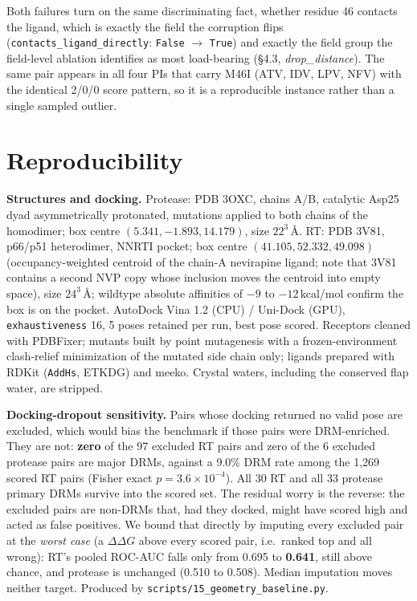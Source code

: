 \documentclass{article}
\newcommand{\ddg}{\ensuremath{\Delta\Delta G}}
\newcommand{\kcal}{\,kcal/mol}
\begin{document}
Both failures turn on the same discriminating fact, whether residue 46 contacts
the ligand, which is exactly the field the corruption flips
(\texttt{contacts\_ligand\_directly}: \texttt{False} $\rightarrow$ \texttt{True})
and exactly the field group the field-level ablation identifies as most load-bearing
(\S4.3, \emph{drop\_distance}). The same pair appears in all four PIs that carry
M46I (ATV, IDV, LPV, NFV) with the identical 2/0/0 score pattern, so it is a
reproducible instance rather than a single sampled outlier.

\section{Reproducibility}
\label{app:repro}

\textbf{Structures and docking.} Protease: PDB 3OXC, chains A/B, catalytic Asp25
dyad asymmetrically protonated, mutations applied to both chains of the homodimer;
box centre $(5.341, -1.893, 14.179)$, size $22^3$\,\AA. RT: PDB 3V81, p66/p51
heterodimer, NNRTI pocket; box centre $(41.105, 52.332, 49.098)$ (occupancy-weighted
centroid of the chain-A nevirapine ligand; note that 3V81 contains a second NVP copy
whose inclusion moves the centroid into empty space), size $24^3$\,\AA; wildtype
absolute affinities of $-9$ to $-12$\kcal{} confirm the box is on the pocket.
AutoDock Vina 1.2 (CPU) / Uni-Dock (GPU), \texttt{exhaustiveness} 16, 5 poses
retained per run, best pose scored. Receptors cleaned with PDBFixer; mutants built by point
mutagenesis with a frozen-environment clash-relief minimization of the mutated
side chain only; ligands prepared with RDKit (\texttt{AddHs}, ETKDG) and meeko.
Crystal waters, including the conserved flap water, are stripped.

\textbf{Docking-dropout sensitivity.} Pairs whose docking returned no valid pose
are excluded, which would bias the benchmark if those pairs were DRM-enriched.
They are not: \textbf{zero} of the 97 excluded RT pairs and zero of the 6 excluded
protease pairs are major DRMs, against a 9.0\% DRM rate among the 1{,}269 scored
RT pairs (Fisher exact $p=3.6\times10^{-4}$). All 30 RT and all 33 protease
primary DRMs survive into the scored set. The residual worry is the reverse: the
excluded pairs are non-DRMs that, had they docked, might have scored high and
acted as false positives. We bound that directly by imputing every excluded pair
at the \emph{worst case} (a \ddg{} above every scored pair, i.e.\ ranked top and
all wrong): RT's pooled ROC-AUC falls only from 0.695 to \textbf{0.641}, still
above chance, and protease is unchanged (0.510 to 0.508). Median imputation moves
neither target. Produced by \texttt{scripts/15\_geometry\_baseline.py}.
\end{document}
